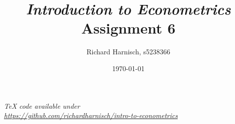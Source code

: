 \documentclass[a4paper]{article}
\begin{document}
\title{\textit{Introduction to Econometrics}\\Assignment 6}
\author{Richard Harnisch, s5238366}
\date{\today}
\maketitle

\makeatletter
\newcommand{\answer}[1]{%
    \par\medskip
    \noindent
    \hspace*{-\@totalleftmargin}%
    \fbox{%
        \parbox{\dimexpr\textwidth-2\fboxsep-2\fboxrule}{#1}%
    }%
    \par\medskip
}
\makeatother

\noindent\textit{TeX code available under\\ \url{https://github.com/richardharnisch/intro-to-econometrics}}
\end{document}
